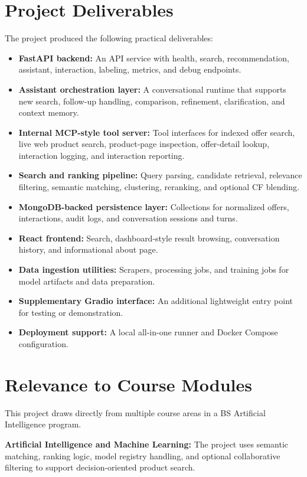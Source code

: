 \documentclass[12pt,a4paper,oneside]{report}
\begin{document}
\section{Project Deliverables}
The project produced the following practical deliverables:
\begin{itemize}[leftmargin=0.35in]
    \item \textbf{FastAPI backend:} An API service with health, search, recommendation, assistant, interaction, labeling, metrics, and debug endpoints.
    \item \textbf{Assistant orchestration layer:} A conversational runtime that supports new search, follow-up handling, comparison, refinement, clarification, and context memory.
    \item \textbf{Internal MCP-style tool server:} Tool interfaces for indexed offer search, live web product search, product-page inspection, offer-detail lookup, interaction logging, and interaction reporting.
    \item \textbf{Search and ranking pipeline:} Query parsing, candidate retrieval, relevance filtering, semantic matching, clustering, reranking, and optional CF blending.
    \item \textbf{MongoDB-backed persistence layer:} Collections for normalized offers, interactions, audit logs, and conversation sessions and turns.
    \item \textbf{React frontend:} Search, dashboard-style result browsing, conversation history, and informational about page.
    \item \textbf{Data ingestion utilities:} Scrapers, processing jobs, and training jobs for model artifacts and data preparation.
    \item \textbf{Supplementary Gradio interface:} An additional lightweight entry point for testing or demonstration.
    \item \textbf{Deployment support:} A local all-in-one runner and Docker Compose configuration.
\end{itemize}

\section{Relevance to Course Modules}
This project draws directly from multiple course areas in a BS Artificial Intelligence program.

\textbf{Artificial Intelligence and Machine Learning:} The project uses semantic matching, ranking logic, model registry handling, and optional collaborative filtering to support decision-oriented product search.
\end{document}
